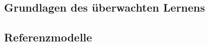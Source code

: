\documentclass[12pt,a4paper]{article}
\begin{document}
\subsection{Grundlagen des überwachten Lernens}

\subsection{Referenzmodelle}
\label{sec:referenzmodelle}
%
%
%
\end{document}
